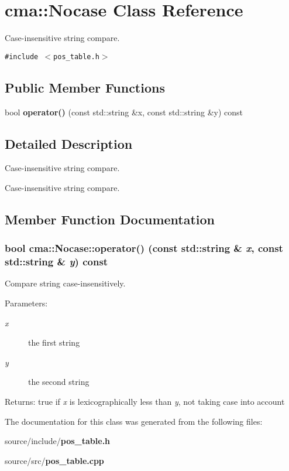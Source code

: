 \section{cma::Nocase Class Reference}
\label{classcma_1_1Nocase}
Case-insensitive string compare.  


{\tt \#include $<$pos\_\-table.h$>$}

\subsection*{Public Member Functions}
\begin{CompactItemize}
\item 
bool {\bf operator()} (const std::string \&x, const std::string \&y) const 
\end{CompactItemize}


\subsection{Detailed Description}
Case-insensitive string compare. 

Case-insensitive string compare. 

\subsection{Member Function Documentation}
\subsubsection[{operator()}]{\setlength{\rightskip}{0pt plus 5cm}bool cma::Nocase::operator() (const std::string \& {\em x}, \/  const std::string \& {\em y}) const}\label{classcma_1_1Nocase_26ede1cd9f2d4ee5796af335019014e1}


Compare string case-insensitively. \begin{Desc}
\item[Parameters:]
\begin{description}
\item[{\em x}]the first string \item[{\em y}]the second string \end{description}
\end{Desc}
\begin{Desc}
\item[Returns:]true if {\em x\/} is lexicographically less than {\em y\/}, not taking case into account \end{Desc}


The documentation for this class was generated from the following files:\begin{CompactItemize}
\item 
source/include/{\bf pos\_\-table.h}\item 
source/src/{\bf pos\_\-table.cpp}\end{CompactItemize}
